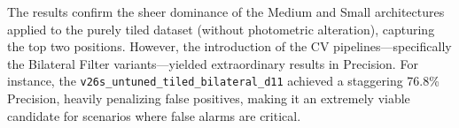\begin{table}[hbt!]
    \centering
    \caption{Top 7 Final YOLOv26 Models (combined with CV filters) ranked by Validation mAP@50.}
    \label{tab:top_models}
\end{table}

The results confirm the sheer dominance of the Medium and Small architectures applied to the purely tiled dataset (without photometric alteration), capturing the top two positions. However, the introduction of the CV pipelines—specifically the Bilateral Filter variants—yielded extraordinary results in Precision. For instance, the \texttt{v26s\_untuned\_tiled\_bilateral\_d11} achieved a staggering 76.8\% Precision, heavily penalizing false positives, making it an extremely viable candidate for scenarios where false alarms are critical.
